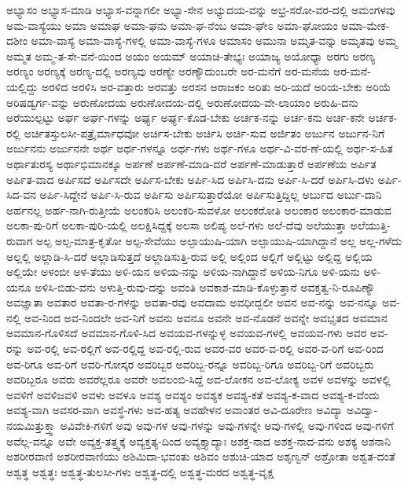 {ಅಭ್ಯಾಸಂ
ಅಭ್ಯಾಸ-ಮಾಡಿ
ಅಭ್ಯಾಸ-ವನ್ನಾಗಲೀ
ಅಭ್ಯಾ-ಸೇನ
ಅಭ್ಯುದಯ-ವನ್ನು
ಅಭ್ರ-ಸರೋ-ವರ-ದಲ್ಲಿ
ಅಮಂಗಳವು
ಅಮ-ವಾಸ್ಯೆಯು
ಅಮಾ
ಅಮಾಘ
ಅಮಾ-ಘನು
ಅಮಾ-ಘ-ನೆಂಬ
ಅಮಾ-ಘೇಽ
ಅಮಾ-ಘೋಯಂ
ಅಮಾ-ಮೇಕ-ದಶೀಂ
ಅಮಾ-ವಾಸ್ಯೆ
ಅಮಾ-ವಾಸ್ಯೆ-ಗಳಲ್ಲಿ
ಅಮಾ-ವಾಸ್ಯೆ-ಗಳೂ
ಅಮಾಸಂ
ಅಮುನಾ
ಅಮೃತ-ವನ್ನು
ಅಮೃತವು
ಅಮ್ಮ
ಅಮ್ಮತ
ಅಮ್ಮ-ತ-ಸೇ-ವನೆ-ಯಿಂದ
ಅಯಂ
ಅಯಮ್
ಅಯಾಚಿ-ತೇಭ್ಯಃ
ಅಯಾಜ್ಯ
ಅಯೋಧ್ಯಾ
ಅರಗು
ಅರಣ್ಯ
ಅರಣ್ಯಂ
ಅರಣ್ಯಕ್ಕೆ
ಅರಣ್ಯ-ದಲ್ಲಿ
ಅರಣ್ಯವು
ಅರಣ್ಯೇ
ಅರಣ್ಯೌದುಂಬರೇ
ಅರ-ಮನೆಗೆ
ಅರ-ಮನೆಯ
ಅರ-ಮನೆ-ಯಲ್ಲಿದ್ದು
ಅರಳಿದ
ಅರಳಿಸಿ
ಅರ-ವತ್ತಾರು
ಅರವತ್ತು
ಅರಸನ
ಅರಾಜಕಂ
ಅರಿತು
ಅರಿ-ಯದೆ
ಅರಿಯ-ಬೇಕು
ಅರಿಯೆ
ಅರಿಷಡ್ವರ್ಗ-ವನ್ನು
ಅರುಣೋದಯ
ಅರುಣೋದಯ-ದಲ್ಲಿ
ಅರುಣೋದಯ-ವೇ-ಲಾಯಾಂ
ಅರುಹಿ-ದನು
ಅರೆಯುಲ್ಪಟ್ಟು
ಅರ್ಘ
ಅರ್ಘ-ಗಳನ್ನು
ಅರ್ಘ್ಯ
ಅರ್ಘ್ಯ-ಕೊಡ-ಬೇಕು
ಅರ್ಚಕ-ನನ್ನು
ಅರ್ಚ-ಕನು
ಅರ್ಚ-ಕನೇ
ಅರ್ಚಕ-ರಲ್ಲಿ
ಅರ್ಚಿತಸ್ತುಲಸೀ-ಪತ್ರೈರ್ಮಾಧವೋ
ಅರ್ಚಿಸ-ಬೇಕು
ಅರ್ಚಿಸಿ
ಅರ್ಚಿ-ಸುವ
ಅರ್ಜಿತಂ
ಅರ್ಜುನ
ಅರ್ಜುನ-ನಿಗೆ
ಅರ್ಜುನನು
ಅರ್ಜುನನೇ
ಅರ್ಥ
ಅರ್ಥ-ಗಳನ್ನೂ
ಅರ್ಥ-ಗಳು
ಅರ್ಥ-ಗಳೂ
ಅರ್ಥ-ವಿ-ವರ-ಣೆ-ಯಲ್ಲಿ
ಅರ್ಥ-ಸ-ಹಿತ
ಅರ್ಥಾತುರಸ್ಯ
ಅರ್ಥಾಭಿಮಾನಕ್ಕೂ
ಅರ್ಪಣೆ
ಅರ್ಪಣೆ-ಮಾಡಿ-ದರೆ
ಅರ್ಪಣೆ-ಮಾಡುತ್ತಾರೆ
ಅರ್ಪಣೆಯ
ಅರ್ಪಿತ
ಅರ್ಪಿತ-ವಾದ
ಅರ್ಪಿಸದೆ
ಅರ್ಪಿಸದೇ
ಅರ್ಪಿಸ-ಬೇಕು
ಅರ್ಪಿ-ಸಿದ
ಅರ್ಪಿಸಿ-ದನು
ಅರ್ಪಿ-ಸಿ-ದರೆ
ಅರ್ಪಿಸಿ-ದಳು
ಅರ್ಪಿ-ಸಿದ-ವನ
ಅರ್ಪಿ-ಸಿದ್ದೇನೆ
ಅರ್ಪಿ-ಸಿ-ರುವ
ಅರ್ಪಿಸು
ಅರ್ಪಿಸುತ್ತಾರೆಯೋ
ಅರ್ಪಿಸುತ್ತಿದ್ದಿಲ್ಲ
ಅರ್ಬುದ
ಅರ್ಬು-ದಾನಿ
ಅರ್ಹನಲ್ಲ
ಅರ್ಹ-ನಾಗಿ-ರುತ್ತೀಯೆ
ಅಲಂಕರಿಸಿ
ಅಲಂಕರಿ-ಸುವಳೋ
ಅಲಂಕರೋತಿ
ಅಲಂಕಾರ
ಅಲಂಕಾರ-ಮಾಡುವ
ಅಲಕಾ-ಪು-ರಿಗೆ
ಅಲಕಾ-ಪುರಿ-ಯಲ್ಲಿ
ಅಲಕ್ಷಿಸಿದ್ದಕ್ಕೆ
ಅಲಸಾ
ಅಲಿಪ್ಯ
ಅಲೆ-ಗಳು
ಅಲೆ-ದೆವು
ಅಲೆಯುತ್ತಾ
ಅಲೆಯುತ್ತಿ-ರುವಾಗ
ಅಲ್ಪ
ಅಲ್ಪ-ಮಾತ್ರ-ಕೃತೋ
ಅಲ್ಪ-ಸೇವೆಯು
ಅಲ್ಪಾಯುಷಿ-ಯಾಗಿ
ಅಲ್ಪಾಯುಷಿ-ಯಾಗಿದ್ದಾನೆ
ಅಲ್ಲ
ಅಲ್ಲ-ಗಳೆದು
ಅಲ್ಲಲ್ಲಿ
ಅಲ್ಲಾಡಿ-ಸಿ-ದರೆ
ಅಲ್ಲಾಡಿಸುತ್ತದೆ
ಅಲ್ಲಾಡಿಸುತ್ತಿ-ರುವ
ಅಲ್ಲಿ
ಅಲ್ಲಿಂದ
ಅಲ್ಲಿಗೆ
ಅಲ್ಲಿಟ್ಟು
ಅಲ್ಲಿದ್ದ
ಅಲ್ಲಿಯ
ಅಲ್ಲಿಯೇ
ಅಳಂಬೀ
ಅಳ-ತೆಯು
ಅಳಿ-ಯನ
ಅಳಿಯ-ನನ್ನು
ಅಳಿಯ-ನಾಗಿದ್ದಾನೆ
ಅಳಿಯ-ನಿಗೂ
ಅಳಿ-ಯನು
ಅಳಿ-ಯನೂ
ಅಳಿಸಿ-ಬಿಡು-ವನು
ಅಳುತ್ತಿ-ರುವು-ದನ್ನು
ಅವಂತಿ
ಅವಕಾಶ-ಮಾಡಿ-ಕೊಳ್ಳುತ್ತಾನೆ
ಅವಕ್ತತ್ವ-ನಿ-ರೂಪಿಣ್ಯೌ
ಅವಜ್ಞಾತಾ
ಅವತಾರ
ಅವತಾ-ರ-ಗಳನ್ನು
ಅವತಾ-ರವು
ಅವದಾಮ
ಅವಧೀದ್ಬಲೀ
ಅವನ
ಅವ-ನನ್ನು
ಅವ-ನನ್ನೂ
ಅವ-ನಲ್ಲಿ
ಅವ-ನಿಂದ
ಅವ-ನಿಂದಲೇ
ಅವ-ನಿಗೆ
ಅವನು
ಅವನೂ
ಅವನೇ
ಅವ-ನೊಡನೆ
ಅವನ್ನೇ
ಅವಭೃತದ
ಅವಮಾನ
ಅವಮಾನ-ಗೊಳಿಸದೆ
ಅವಮಾನ-ಗೊಳಿ-ಸಿದ
ಅವಯವ-ಗಳನ್ನುಳ್ಳ
ಅವಯವ-ಗಳಲ್ಲಿ
ಅವಯವ-ಗಳು
ಅವರ
ಅವ-ರನ್ನು
ಅವ-ರಲ್ಲಿ
ಅವ-ರಲ್ಲಿಗೆ
ಅವ-ರಲ್ಲಿದ್ದ
ಅವ-ರಲ್ಲಿ-ರುವ
ಅವರ-ವರ
ಅವರ-ವ-ರಲ್ಲಿ
ಅವರ-ವ-ರಿಗೆ
ಅವ-ರಿಂದ
ಅವ-ರಿಗೂ
ಅವ-ರಿಗೆ
ಅವರಿ-ಗೋಸ್ಕರ
ಅವರಿಬ್ಬರ
ಅವರಿಬ್ಬ-ರನ್ನೂ
ಅವರಿಬ್ಬ-ರಿಗೂ
ಅವರಿಬ್ಬ-ರಿಗೆ
ಅವರಿಬ್ಬರು
ಅವರಿಬ್ಬರೂ
ಅವರು
ಅವರೆಲ್ಲರೂ
ಅವರೇ
ಅವಲಂಬಿ-ಸಿದ್ದೆ
ಅವ-ಲೋಕನ
ಅವ-ಲೋಕ್ಯ
ಅವಳ
ಅವಳನ್ನು
ಅವಳಲ್ಲಿ
ಅವಳಿಗೆ
ಅವಳಿಜವಳಿ
ಅವಳು
ಅವಳೂ
ಅವಶ್ಯ
ಅವಶ್ಯಂ
ಅವಶ್ಯಕ
ಅವಶ್ಯ-ಕತೆ
ಅವಶ್ಯ-ಕ-ವಾದ
ಅವಶ್ಯ-ಕ-ವೆಂದು
ಅವಶ್ಯ-ವಾಗಿ
ಅವಸರ-ವಾಗಿ
ಅವಸ್ಥೆ-ಗಳು
ಅವ-ಹತ್ಯ
ಅವಹೇಳನ
ಅವಾಂತರ
ಅವಿ-ದೂರೇಣ
ಅವಿದ್ಯಾ
ಅವಿದ್ವಾ-ನಯಮಿತ್ತುಕ್ತ್ವಾ
ಅವಿವೇಕಿ-ಗಳಿಗೆ
ಅವು
ಅವು-ಗಳ
ಅವು-ಗಳನ್ನು
ಅವು-ಗಳನ್ನೇ
ಅವು-ಗಳಲ್ಲಿ
ಅವು-ಗಳಿಂದ
ಅವು-ಗಳಿಗೆ
ಅವೆಲ್ಲ-ವನ್ನೂ
ಅವೇ
ಅವ್ಯಕ್ತ-ತತ್ತ್ವಕ್ಕೆ
ಅವ್ಯಕ್ತತ್ಯ-ದಿಂದ
ಅವ್ಯಕ್ತ್ಯಾದ್ಯಾಃ
ಅಶಕ್ತ-ನಾದ
ಅಶಕ್ತ-ನಾದ-ವನು
ಅಶಕ್ಯ
ಅಶನಾನಿ
ಅಶರೀರವಾಣಿ
ಅಶರೀರವಾಣಿಯು
ಅಶಿಮಿದಾ-ಭವಂತು
ಅಶಿವಂ
ಅಶುಚಿ-ಯಾದ
ಅಶೃಣ್ವನ್
ಅಶ್ರೋತಾ
ಅಶ್ವತ-ದಂತೆ
ಅಶ್ವತ್ಥ
ಅಶ್ವತ್ಥಃ
ಅಶ್ವತ್ಥ-ತುಲಸೀ-ಗಳು
ಅಶ್ವತ್ಥ-ದಲ್ಲಿ
ಅಶ್ವತ್ಥ-ಮರದ
ಅಶ್ವತ್ಥ-ವೃಕ್ಷ
}
